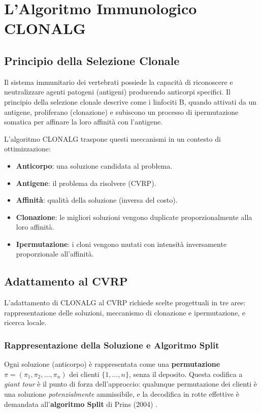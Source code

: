 \documentclass[a4paper,12pt]{article}
\begin{document}
\section{L'Algoritmo Immunologico CLONALG}

\subsection{Principio della Selezione Clonale}

Il sistema immunitario dei vertebrati possiede la capacità di riconoscere e neutralizzare agenti patogeni (antigeni) producendo anticorpi specifici. Il principio della selezione clonale descrive come i linfociti B, quando attivati da un antigene, proliferano (clonazione) e subiscono un processo di ipermutazione somatica per affinare la loro affinità con l'antigene.

L'algoritmo CLONALG traspone questi meccanismi in un contesto di ottimizzazione:
\begin{itemize}
    \item \textbf{Anticorpo}: una soluzione candidata al problema.
    \item \textbf{Antigene}: il problema da risolvere (CVRP).
    \item \textbf{Affinità}: qualità della soluzione (inversa del costo).
    \item \textbf{Clonazione}: le migliori soluzioni vengono duplicate proporzionalmente alla loro affinità.
    \item \textbf{Ipermutazione}: i cloni vengono mutati con intensità inversamente proporzionale all'affinità.
\end{itemize}

\subsection{Adattamento al CVRP}

L'adattamento di CLONALG al CVRP richiede scelte progettuali in tre aree: rappresentazione delle soluzioni, meccanismo di clonazione e ipermutazione, e ricerca locale.

\subsubsection{Rappresentazione della Soluzione e Algoritmo Split}

Ogni soluzione (anticorpo) è rappresentata come una \textbf{permutazione} $\pi = (\pi_1, \pi_2, \dots, \pi_n)$ dei clienti $\{1, \dots, n\}$, senza il deposito. Questa codifica a \emph{giant tour} è il punto di forza dell'approccio: qualunque permutazione dei clienti è una soluzione \emph{potenzialmente} ammissibile, e la decodifica in rotte effettive è demandata all'\textbf{algoritmo Split} di Prins (2004) \cite{prins}.
\end{document}
